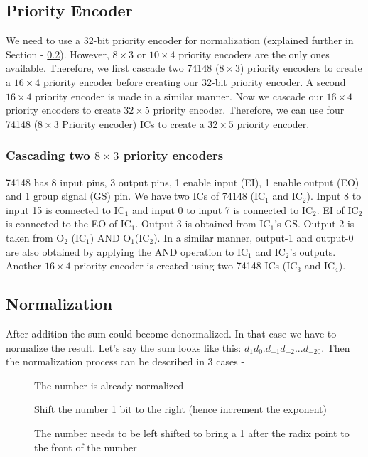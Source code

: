 \documentclass[14pt]{article}
\begin{document}
\subsection{Priority Encoder}
We need to use a 32-bit priority encoder for normalization (explained further in Section - \ref{normalizer_section}). However, $8\times3$ or $10\times4$ priority encoders are the only ones available.  Therefore, we first cascade two 74148 ($8\times3$) priority encoders to create a $16 \times 4$ priority encoder before creating our 32-bit priority encoder. A second $16\times4$ priority encoder is made in a similar manner. Now we cascade our $16\times4$ priority encoders to create $32 \times 5$ priority encoder. Therefore, we can use four 74148 ($8\times3$ Priority encoder) ICs to create a $32\times5$ priority encoder.

\subsubsection{Cascading two $8\times3$ priority encoders}
74148 has 8 input pins, 3 output pins, 1 enable input (EI), 1 enable output (EO) and 1 group signal (GS) pin. We have two ICs of 74148 ($\textrm{IC}_1$ and $\textrm{IC}_2$). Input 8 to input 15 is connected to $\textrm{IC}_1$ and input 0 to input 7 is connected to $\textrm{IC}_2$.  EI of $\textrm{IC}_2$ is connected to the EO of $\textrm{IC}_1$. Output 3 is obtained from $\textrm{IC}_1$'s GS. Output-2 is taken from $\textrm{O}_2$ ($\textrm{IC}_1$) AND $\textrm{O}_1$($\textrm{IC}_2$). In a similar manner, output-1 and output-0 are also obtained by applying the AND operation to $\textrm{IC}_1$ and $\textrm{IC}_2$'s outputs. Another $16\times4$ priority encoder is created using two 74148 ICs ($\textrm{IC}_3$ and $\textrm{IC}_4$).

\subsection{Normalization}\label{normalizer_section}
After addition the sum could become denormalized. In that case we have to normalize the result. Let's say the sum looks like this:  $d_1d_0.d_{-1}d_{-2}...d_{-20}$. Then the normalization process can be described in 3 cases -
\begin{description}
	\item[] The number is already normalized
	\item[] Shift the number 1 bit to the right (hence increment the exponent)
	\item[] The number needs to be left shifted to bring a 1 after the radix point to the front of the number
\end{description}
\end{document}
